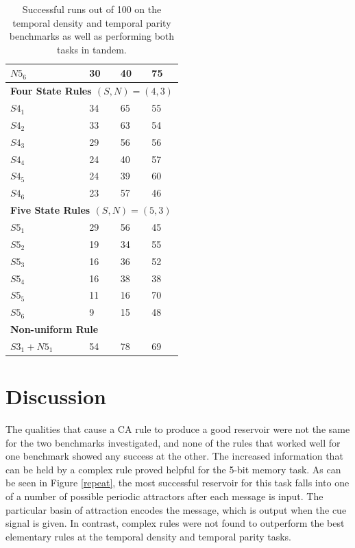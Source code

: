\documentclass{elsarticle}
\begin{document}
\begin{multicols}{2}
\begin{table}[H]
\begin{tabular}{|l|l|l|l|}
			$N5_{6}$       & 30                & 40          & 75          \\ \hline
			\multicolumn{4}{|l|}{\textbf{Four State Rules \boldmath$(S,N) = (4,3)$}} \\ 
			\hline
			$S4_{1}$       & 34                & 65          & 55          \\ \hline
			$S4_{2}$       & 33                & 63          & 54          \\ \hline
			$S4_{3}$       & 29                & 56          & 56          \\ \hline
			$S4_{4}$       & 24                & 40          & 57          \\ \hline
			$S4_{5}$       & 24                & 39          & 60          \\ \hline
			$S4_{6}$       & 23                & 57          & 46          \\ \hline
			\multicolumn{4}{|l|}{\textbf{Five State Rules \boldmath$(S,N) = (5,3)$}} \\ 
			\hline
			$S5_{1}$       & 29                & 56          & 45          \\ \hline
			$S5_{2}$       & 19                & 34          & 55          \\ \hline
			$S5_{3}$       & 16                & 36          & 52          \\ \hline
			$S5_{4}$       & 16                & 38          & 38          \\ \hline
			$S5_{5}$       & 11                & 16          & 70          \\ \hline
			$S5_{6}$       & 9                 & 15          & 48          \\ \hline
			\multicolumn{4}{|l|}{\textbf{Non-uniform Rule}} \\ \hline
			$S3_1 +  N5_1$ & 54                & 78          & 69          \\ \hline
		\end{tabular}
		\caption{Successful runs out of 100 on the temporal density and temporal parity 
			benchmarks as well as performing both tasks in tandem.
		}
		\label{table:results_temp_dens}
	\end{table}
	
	
	\section{Discussion}\label{discussion}
	The qualities that cause a CA rule to produce a good reservoir were not the 
	same for the two benchmarks investigated, and none of the rules that worked 
	well for one benchmark showed any success at the other. The increased 
	information that can be held by a complex rule proved helpful for the 5-bit 
	memory task. As can be seen in Figure \ref{repeat}, the most successful 
	reservoir for this task falls into one of a number of possible  periodic 
	attractors after each message is input. The particular basin of attraction 
	encodes the message, which is output when the cue signal is given. In 
	contrast, complex rules were not found to outperform the best elementary 
	rules at the temporal density and temporal parity tasks.
	

\end{multicols}
\end{document}
